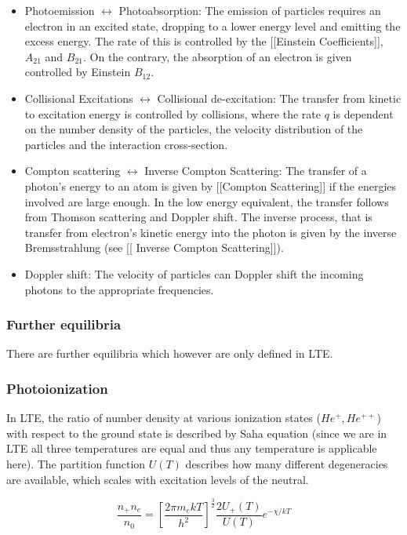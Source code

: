 \documentclass{article}
\begin{document}
\begin{itemize} 
\item Photoemission $\leftrightarrow$ Photoabsorption: The emission of particles requires an electron in an excited state, dropping to a lower energy level and emitting the excess energy. The rate of this is controlled by the [[Einstein Coefficients]], $A_21$ and $B_21$. On the contrary, the absorption of an electron is given controlled by Einstein $B_12$. 
\item  Collisional Excitations $\leftrightarrow$ Collisional de-excitation: The transfer from kinetic to excitation energy is controlled by collisions, where the rate $q$ is dependent on the number density of the particles, the velocity distribution of the particles and the interaction cross-section. 
\item  Compton scattering $\leftrightarrow$ Inverse Compton Scattering: The transfer of a photon's energy to an atom is given by [[Compton Scattering]] if the energies involved are large enough. In the low energy equivalent, the transfer follows from Thomson scattering and Doppler shift. The inverse process, that is transfer from electron's kinetic energy into the photon is given by the inverse Bremsstrahlung (see [[ Inverse Compton Scattering]]). 
\item Doppler shift: The velocity of particles can Doppler shift the incoming photons to the appropriate frequencies.   
\end{itemize} 

\subsubsection{Further equilibria}
There are further equilibria which however are only defined in LTE. 

\subsubsection{Photoionization} 
In LTE,  the ratio of number density at various ionization states ($He^{+}, He^{++}$) with respect to the ground state is described by Saha equation (since we are in LTE all three temperatures are equal and thus any temperature is applicable here). The partition function $U(T)$ describes how many different degeneracies are available, which scales with excitation levels of the neutral. 

\begin{equation}
\frac{n_+n_e}{n_0} = \left[\frac{2\pi m_e kT}{h^2} \right]^\frac{3}{2}\frac{2 U_+(T)}{U(T)} e^{-\chi/kT}
\end {equation}
\end{document}
